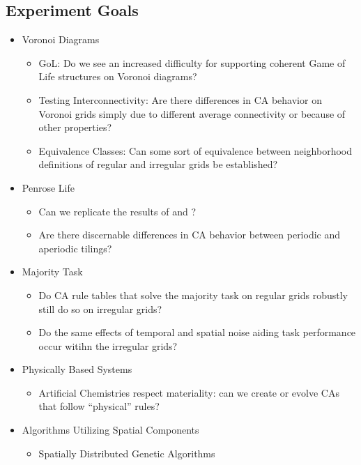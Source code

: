 \documentclass[a4paper, 11pt]{article}
\begin{document}
\subsection*{Experiment Goals}
\begin{itemize}

\item Voronoi Diagrams
\begin{itemize}
\item GoL: Do we see an increased difficulty for supporting coherent Game of Life structures on Voronoi diagrams?
\item Testing Interconnectivity: Are there differences in CA behavior on Voronoi grids simply due to different average connectivity or because of other properties?
\item Equivalence Classes: Can some sort of equivalence between neighborhood definitions of regular and irregular grids be established?
\end{itemize}

\item Penrose Life
\begin{itemize}
\item Can we replicate the results of \citeauthor{hi05} and \citeauthor{ow10}?
\item Are there discernable differences in CA behavior between periodic and aperiodic tilings?
\end{itemize}

\item Majority Task
\begin{itemize}
\item Do CA rule tables that solve the majority task on regular grids robustly still do so on irregular grids?
\item Do the same effects of temporal and spatial noise \citeauthor{me07} aiding task performance occur witihn the irregular grids?
\end{itemize}

\item Physically Based Systems
\begin{itemize}
\item Artificial Chemistries respect materiality: can we create or evolve CAs that follow ``physical'' rules?
\end{itemize}

\item Algorithms Utilizing Spatial Components
\begin{itemize}
\item Spatially Distributed Genetic Algorithms
\end{itemize}

\end{itemize}
\end{document}
